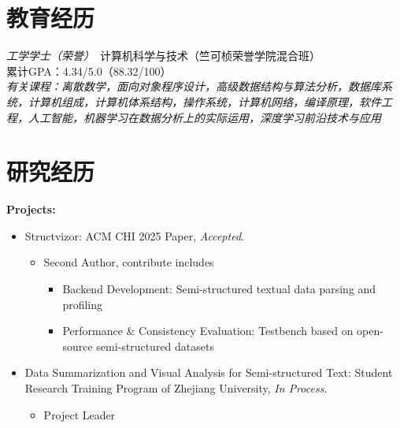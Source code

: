 \documentclass{resume}
\begin{document}


 
\section{教育经历}
\textit{工学学士（荣誉）}\ 计算机科学与技术（竺可桢荣誉学院混合班）\\
累计GPA：4.34/5.0（88.32/100） \\
\textit{有关课程：离散数学，面向对象程序设计，高级数据结构与算法分析，数据库系统，计算机组成，计算机体系结构，操作系统，计算机网络，编译原理，软件工程，人工智能，机器学习在数据分析上的实际运用，深度学习前沿技术与应用}

\section{研究经历}
\role{导师：巫英才，翁荻} 


\textbf{Projects:}
\begin{itemize}
  \item Structvizor: ACM CHI 2025 Paper, \textit{Accepted}.
    \begin{itemize}
        \item Second Author, contribute includes
        \begin{itemize}
            \item Backend Development: Semi-structured textual data parsing and profiling
            \item Performance \& Consistency Evaluation: Testbench based on open-source semi-structured datasets
        \end{itemize}
    \end{itemize}
  \item Data Summarization and Visual Analysis for Semi-structured Text: Student Research Training Program of Zhejiang University, \textit{In Process}.
    \begin{itemize}
        \item Project Leader
    \end{itemize}
\end{itemize}
\end{document}
